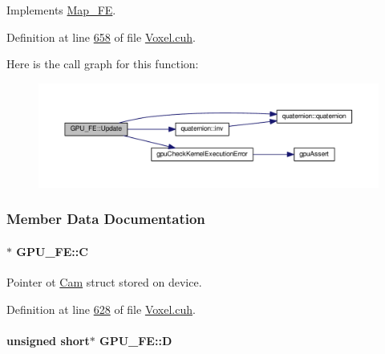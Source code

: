 Implements \hyperlink{classMap__FE_a901af5011ef87bfd1dac3e568ef29c47}{Map\+\_\+\+FE}.



Definition at line \hyperlink{Voxel_8cuh_source_l00658}{658} of file \hyperlink{Voxel_8cuh_source}{Voxel.\+cuh}.



Here is the call graph for this function\+:\nopagebreak
\begin{figure}[H]
\begin{center}
\leavevmode
\includegraphics[width=350pt]{classGPU__FE_aa9039bd613961d4e0911b8514ed14fba_cgraph}
\end{center}
\end{figure}




\subsubsection{Member Data Documentation}
\paragraph[{\texorpdfstring{C}{C}}]{$\ast$ G\+P\+U\+\_\+\+F\+E\+::C\hspace{0.3cm}{\ttfamily [private]}}\hypertarget{classGPU__FE_aada926a7b999648bcb837507bf6a75d3}{}\label{classGPU__FE_aada926a7b999648bcb837507bf6a75d3}


Pointer ot \hyperlink{structCam}{Cam} struct stored on device. 



Definition at line \hyperlink{Voxel_8cuh_source_l00628}{628} of file \hyperlink{Voxel_8cuh_source}{Voxel.\+cuh}.

\paragraph[{\texorpdfstring{D}{D}}]{\setlength{\rightskip}{0pt plus 5cm}unsigned short$\ast$ G\+P\+U\+\_\+\+F\+E\+::D\hspace{0.3cm}{\ttfamily [private]}}\hypertarget{classGPU__FE_a20be80d2f552afc21f97831fcc4983e9}{}\label{classGPU__FE_a20be80d2f552afc21f97831fcc4983e9}


